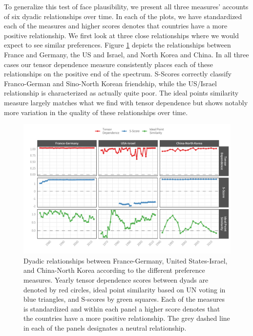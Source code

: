 \documentclass[12pt,pdflatex]{elsarticle}
\begin{document}
To generalize this test of face plausibility, we present all three measures' accounts of six dyadic relationships over time. In each of the plots, we have standardized each of the measures and higher scores denotes that countries have a more positive relationship. We first look at three close relationships where we would expect to see similar preferences. Figure \ref{friendly:dyads} depicts the relationships between France and Germany, the US and Israel, and North Korea and China. In all three cases our tensor dependence measure consistently places each of these relationships on the positive end of the spectrum. S-Scores correctly classify Franco-German and Sino-North Korean friendship, while the US/Israel relationship is characterized as actually quite poor. The ideal points similarity measure largely matches what we find with tensor dependence but shows notably more variation in the quality of these relationships over time.

\begin{figure}
	\centering
	\includegraphics[width=1\textwidth]{plausPlot_1_border}
	\caption{Dyadic relationships between France-Germany, United States-Israel, and China-North Korea according to the different preference measures. Yearly tensor dependence scores between dyads are denoted by red circles, ideal point similarity based on UN voting in blue triangles, and S-scores by green squares. Each of the measures is standardized and within each panel a higher score denotes that the countries have a more positive relationship. The grey dashed line in each of the panels designates a neutral relationship.}
	\label{friendly:dyads}
\end{figure}
\end{document}

